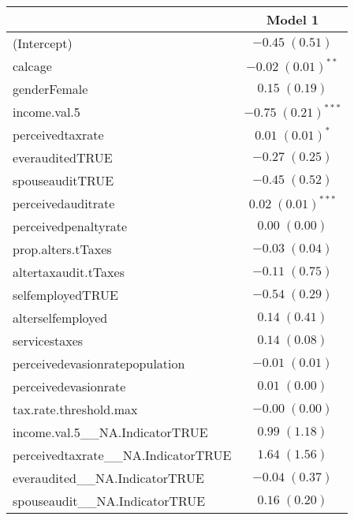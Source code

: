 
\begin{table}
\begin{tabular}{l c }
\hline
 & Model 1 \\
\hline
(Intercept)                                        & $-0.45 \; (0.51)$       \\
calcage                                            & $-0.02 \; (0.01)^{**}$  \\
genderFemale                                       & $0.15 \; (0.19)$        \\
income.val.5                                       & $-0.75 \; (0.21)^{***}$ \\
perceivedtaxrate                                   & $0.01 \; (0.01)^{*}$    \\
everauditedTRUE                                    & $-0.27 \; (0.25)$       \\
spouseauditTRUE                                    & $-0.45 \; (0.52)$       \\
perceivedauditrate                                 & $0.02 \; (0.01)^{***}$  \\
perceivedpenaltyrate                               & $0.00 \; (0.00)$        \\
prop.alters.tTaxes                                 & $-0.03 \; (0.04)$       \\
altertaxaudit.tTaxes                               & $-0.11 \; (0.75)$       \\
selfemployedTRUE                                   & $-0.54 \; (0.29)$       \\
alterselfemployed                                  & $0.14 \; (0.41)$        \\
servicestaxes                                      & $0.14 \; (0.08)$        \\
perceivedevasionratepopulation                     & $-0.01 \; (0.01)$       \\
perceivedevasionrate                               & $0.01 \; (0.00)$        \\
tax.rate.threshold.max                             & $-0.00 \; (0.00)$       \\
income.val.5\_\_NA.IndicatorTRUE                   & $0.99 \; (1.18)$        \\
perceivedtaxrate\_\_NA.IndicatorTRUE               & $1.64 \; (1.56)$        \\
everaudited\_\_NA.IndicatorTRUE                    & $-0.04 \; (0.37)$       \\
spouseaudit\_\_NA.IndicatorTRUE                    & $0.16 \; (0.20)$        \\

\end{tabular}
\end{table}

